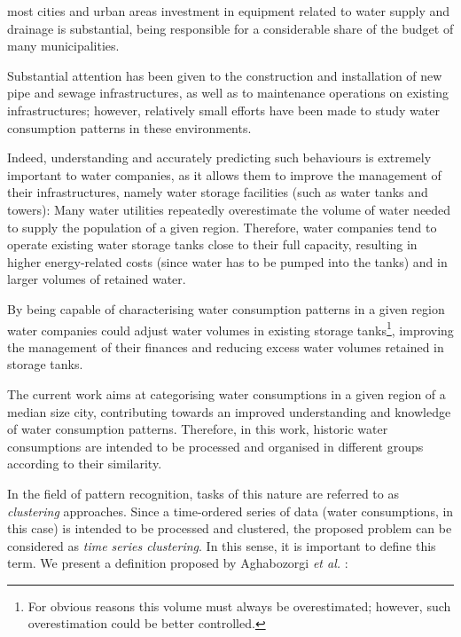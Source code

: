 \documentclass[9pt,journal,compsoc]{IEEEtran}
\begin{document}

 most cities and urban areas investment in equipment related to water supply and drainage is substantial, being responsible for a considerable share of the budget of many municipalities.

Substantial attention has been given to the construction and installation of new pipe and sewage infrastructures, as well as to maintenance operations on existing infrastructures; however, relatively small efforts have been made to study water consumption patterns in these environments.

Indeed, understanding and accurately predicting such behaviours is extremely important to water companies, as it allows them to improve the management of their infrastructures, namely water storage facilities (such as water tanks and towers): Many water utilities repeatedly overestimate the volume of water needed to supply the population of a given region. Therefore, water companies tend to operate existing water storage tanks close to their full capacity, resulting in higher energy-related costs (since water has to be pumped into the tanks) and in larger volumes of retained water. 

By being capable of characterising water consumption patterns in a given region water companies could adjust water volumes in existing storage tanks\footnote{For obvious reasons this volume must always be overestimated; however, such overestimation could be better controlled.}, improving the management of their finances and reducing excess water volumes retained in storage tanks.

The current work aims at categorising water consumptions in a given region of a median size city, contributing towards an improved understanding and knowledge of water consumption patterns. Therefore, in this work, historic water consumptions are intended to be processed and organised in different groups according to their similarity.

In the field of pattern recognition, tasks of this nature are referred to as \emph{clustering} approaches. Since a time-ordered series of data (water consumptions, in this case) is intended to be processed and clustered, the proposed problem can be considered as \emph{time series clustering}. In this sense, it is important to define this term. We present a definition proposed by Aghabozorgi \emph{et al.} \cite{aghabozorgi2015time}:
\end{document}
